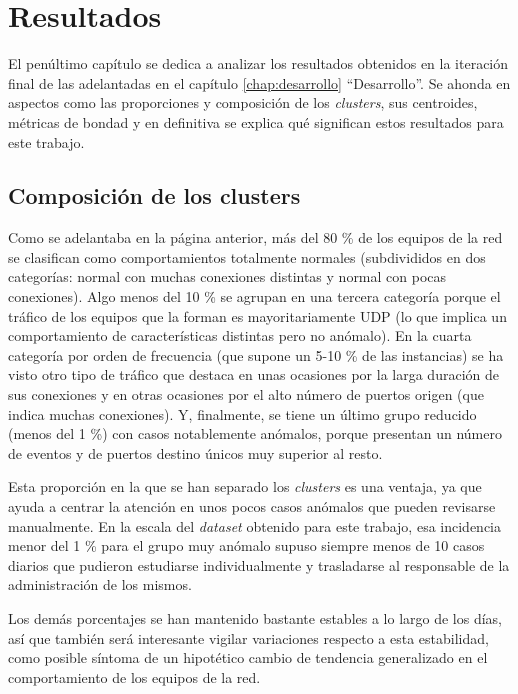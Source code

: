 \chapter{Resultados}\label{chap:resultados}

El penúltimo capítulo se dedica a analizar los resultados obtenidos en la iteración final de las adelantadas en el capítulo \ref{chap:desarrollo} ``Desarrollo''.
Se ahonda en aspectos como las proporciones y composición de los \emph{clusters}, sus centroides, métricas de bondad y en definitiva se explica qué significan estos resultados para este trabajo.

\section{Composición de los clusters}\label{sec:composicionclusters}

Como se adelantaba en la página anterior, más del 80 \% de los equipos de la red se clasifican como comportamientos totalmente normales (subdivididos en dos categorías: normal con muchas conexiones distintas y normal con pocas conexiones).
Algo menos del 10 \% se agrupan en una tercera categoría porque el tráfico de los equipos que la forman es mayoritariamente UDP (lo que implica un comportamiento de características distintas pero no anómalo).
En la cuarta categoría por orden de frecuencia (que supone un 5-10 \% de las instancias) se ha visto otro tipo de tráfico que destaca en unas ocasiones por la larga duración de sus conexiones y en otras ocasiones por el alto número de puertos origen (que indica muchas conexiones).
Y, finalmente, se tiene un último grupo reducido (menos del 1 \%) con casos notablemente anómalos, porque presentan un número de eventos y de puertos destino únicos muy superior al resto.

Esta proporción en la que se han separado los \emph{clusters} es una ventaja, ya que ayuda a centrar la atención en unos pocos casos anómalos que pueden revisarse manualmente.
En la escala del \emph{dataset} obtenido para este trabajo, esa incidencia menor del 1 \% para el grupo muy anómalo supuso siempre menos de 10 casos diarios que pudieron estudiarse individualmente y trasladarse al responsable de la administración de los mismos.

Los demás porcentajes se han mantenido bastante estables a lo largo de los días, así que también será interesante vigilar variaciones respecto a esta estabilidad, como posible síntoma de un hipotético cambio de tendencia generalizado en el comportamiento de los equipos de la red.

